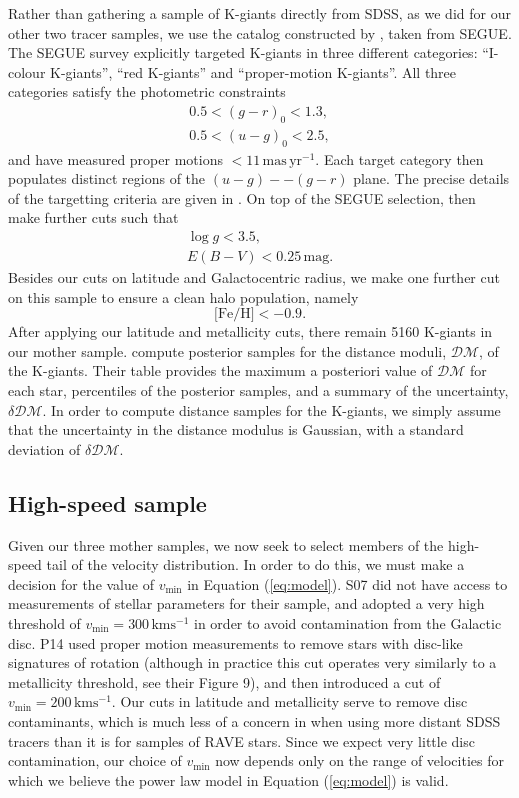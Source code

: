 \documentclass[useAMS,twocolumn,usenatbib]{mn2e}
\def\kms{{\,\mathrm{kms^{-1}}}}
\begin{document}
Rather than gathering a sample of K-giants directly from SDSS, as we did 
for our other two tracer samples, we use the catalog constructed by 
\cite{Xu14}, taken from SEGUE. The SEGUE survey \citep{Ya09} explicitly 
targeted K-giants in three different categories: ``I-colour K-giants'', 
``red K-giants'' and ``proper-motion K-giants''. All three categories 
satisfy the photometric constraints
%
\begin{gather}
0.5 < (g-r)_0 < 1.3, \nonumber \\
0.5 < (u-g)_0 < 2.5,
\end{gather}
%
and have measured proper motions $<11 \,\mathrm{mas\,yr^{-1}}$. Each target category 
then populates distinct regions of the $(u-g)--(g-r)$ plane. The precise details 
of the targetting criteria are given in \cite{Ya09}. On top of the SEGUE selection, 
\citeauthor{Xu14} then make further cuts such that
%
\begin{gather}
\log g < 3.5, \nonumber \\
E(B-V) < 0.25 \,\mathrm{mag}. \nonumber
\end{gather}
%
Besides our cuts on latitude and Galactocentric radius, we make one
further cut on this sample to ensure a clean halo population, namely
%
\begin{equation}
\lbrack \mathrm{Fe/H} \rbrack < -0.9.
\end{equation}
%
After applying our latitude and metallicity cuts, there remain 5160
K-giants in our mother sample. \citeauthor{Xu14} compute posterior
samples for the distance moduli, $\mathcal{DM}$, of the
K-giants. Their table provides the maximum a posteriori value of
$\mathcal{DM}$ for each star, percentiles of the posterior samples,
and a summary of the uncertainty, $\delta \mathcal{DM}$. In order to
compute distance samples for the K-giants, we simply assume that the
uncertainty in the distance modulus is Gaussian, with a standard
deviation of $\delta\mathcal{DM}$.

\subsection{High-speed sample}

Given our three mother samples, we now seek to select members of the
high-speed tail of the velocity distribution. In order to do this, we
must make a decision for the value of $v_\mathrm{min}$ in Equation
(\ref{eq:model}). S07 did not have access to measurements of stellar
parameters for their sample, and adopted a very high threshold of
$v_\mathrm{min} = 300\kms$ in order to avoid contamination from the
Galactic disc. P14 used proper motion measurements to remove stars
with disc-like signatures of rotation (although in practice this cut
operates very similarly to a metallicity threshold, see their Figure
9), and then introduced a cut of $v_\mathrm{min}=200\kms$. Our cuts in
latitude and metallicity serve to remove disc contaminants, which is
much less of a concern in when using more distant SDSS tracers than it
is for samples of RAVE stars. Since we expect very little disc
contamination, our choice of $v_\mathrm{min}$ now depends only on the
range of velocities for which we believe the power law model in
Equation (\ref{eq:model}) is valid.
\end{document}

